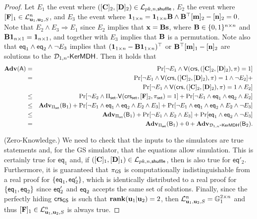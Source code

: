 \begin{proof}
Let $E_1$ the event where $([\mathbf{{C}}]_2,[\mathbf{{D}}]_2)\in\mathcal{L}_{pk,n,\mathsf{shuffle}}$, $E_2$ the event where $[\mathbf{{F}}]_1\in\mathcal{L}_{\mathbf{u}_1,\mathbf{u}_2,S}^n$, and $E_3$ the event where $\mathbf{{1}}_{1\times n}=\mathbf{{1}}_{1\times n}\mathbf{{B}}\wedge\mathbf{{B}}^\top[\mathbf{m}]_2-[\mathbf{n}]_2=0$. Note that $E_2\wedge E_3\Longrightarrow E_1$ since $E_2$ implies that $\mathbf{x}=\mathbf{{B}}\mathbf{s}$, where $\mathbf{{B}}\in\{0,1\}^{n\times n}$ and $\mathbf{{B}}\mathbf{{1}}_{n\times 1}=\mathbf{{1}}_{n\times 1}$, and together with $E_3$ implies that $\mathbf{{B}}$ is a permutation. Note also that $\mathsf{eq}_1\wedge\mathsf{eq}_2\wedge\neg E_3$ implies that $(\mathbf{{1}}_{1\times n}-\mathbf{{B}}\mathbf{{1}}_{1\times n})^\top$ or $\mathbf{{B}}^\top[\mathbf{m}]_1-[\mathbf{n}]_2$ are solutions to the $\mathcal{D}_{1,n}\mbox{-}\mathsf{KerMDH}$. Then it holds that
\begin{eqnarray*}
\mathbf{Adv}(\mathsf{A}) & = &
    \Pr[\neg E_1 \wedge \mathsf{V}(\mathsf{crs},([\mathbf{{C}}]_2,[\mathbf{{D}}]_2),\pi)=1]\\
& = &
    \Pr[\neg E_1 \wedge \mathsf{V}(\mathsf{crs},([\mathbf{{C}}]_2,[\mathbf{{D}}]_2),\pi)=1 \wedge \neg E_2]+\\
& &
    \Pr[\neg E_1 \wedge \mathsf{V}(\mathsf{crs},([\mathbf{{C}}]_2,[\mathbf{{D}}]_2),\pi)=1 \wedge E_2]\\
& \leq &
    \Pr[\neg E_2 \wedge \Pi_{\mathsf{set}}.\mathsf{V}(\mathsf{crs}_{\mathsf{set}},[\mathbf{{F}}]_2,\pi_{\mathsf{set}})=1]+
    \Pr[\neg E_1 \wedge \mathsf{eq}_1 \wedge \mathsf{eq}_2 \wedge E_2]\\
& \leq &
    \mathbf{Adv}_{\Pi_{\mathsf{set}}}(\mathsf{B}_1)+\Pr[\neg E_1 \wedge \mathsf{eq}_1 \wedge \mathsf{eq}_2 \wedge E_2\wedge E_3] + \Pr[\neg E_1 \wedge \mathsf{eq}_1 \wedge \mathsf{eq}_2 \wedge E_2\wedge \neg E_3]\\
& \leq &
    \mathbf{Adv}_{\Pi_{\mathsf{set}}}(\mathsf{B}_1) + \Pr[\neg E_1\wedge E_2 \wedge E_3]+
    \Pr[\mathsf{eq}_1\wedge\mathsf{eq}_2\wedge\neg E_3]\\
& = &
    \mathbf{Adv}_{\Pi_{\mathsf{set}}}(\mathsf{B}_1)+0+\mathbf{Adv}_{\mathcal{D}_{1,n}\mbox{-}\mathsf{KerMDH}}(\mathsf{B}_2).
\end{eqnarray*} 

(Zero-Knowledge.) We need to check that the inputs to the simulators are true statements and, for the GS simulator, that the equations allow simulation. This is certainly true for $\mathsf{eq}_1$ and, if $([\mathbf{{C}}]_1,[\mathbf{{D}}]_1)\in\mathcal{L}_{pk,n,\mathsf{shuffle}}$, then is also true for $\mathsf{eq}'_2$. Furthermore, it is guaranteed that $\pi_{\mathsf{GS}}$ is computationally indistinguishable from a real proof for $\{\mathsf{eq}_1,\mathsf{eq}'_2\}$, which is identically distributed to a real proof for $\{\mathsf{eq}_1,\mathsf{eq}_2\}$ since $\mathsf{eq}'_2$ and $\mathsf{eq}_2$ accepts the same set of solutions.
Finally, since the perfectly hiding $\mathsf{crs}_{\mathsf{GS}}$ is such that $\mathbf{rank}(\mathbf{u}_1|\mathbf{u}_2)=2$, then $\mathcal{L}_{\mathbf{u}_1,\mathbf{u}_2,S}^n=\mathbb{G}_1^{2\times n}$ and thus $[\mathbf{{F}}]_1\in\mathcal{L}_{\mathbf{u}_1,\mathbf{u}_2,S}^n$ is always true.
\end{proof}
